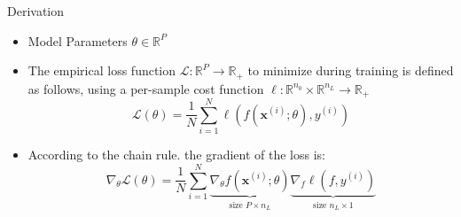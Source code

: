 \documentclass[serif, aspectratio=169]{beamer}
\begin{document}
%
%	

%	
%		
%		
%		
%		
%		



\begin{frame}{Derivation}
	
	\begin{itemize}
		\item Model Parameters \(\theta \in \mathbb{R}^P\)
		
		\item The empirical loss function \(\mathcal{L}: \mathbb{R}^P \to \mathbb{R}_+\)
		to minimize during training is defined as follows, using a per-sample cost function \(\ell: \mathbb{R}^{n_0} \times \mathbb{R}^{n_L} \to \mathbb{R}_+\)
		\[
		\mathcal{L}(\theta) =\frac{1}{N} \sum_{i=1}^N \ell(f(\mathbf{x}^{(i)}; \theta), y^{(i)})
		\]
		\item  According to the chain rule. the gradient of the loss is:
		\[
		\nabla_\theta \mathcal{L}(\theta)= \frac{1}{N} \sum_{i=1}^N \underbrace{\nabla_\theta f(\mathbf{x}^{(i)}; \theta)}_{\text{size }P \times n_L} 
		\underbrace{\nabla_f \ell(f, y^{(i)})}_{\text{size } n_L \times 1}
		\]
		
	\end{itemize}
\end{frame}
\end{document}
